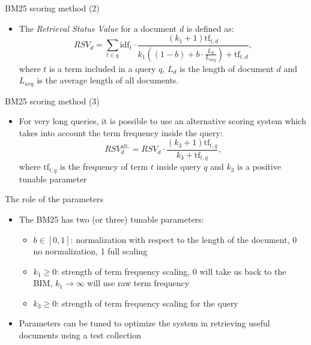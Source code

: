 \documentclass[]{beamer}
\begin{document}
\begin{frame}{BM25 scoring method (2)}
    \begin{itemize}
        \item The \textit{Retrieval Status Value} for a document $d$ is defined as:
    \begin{equation*}
        RSV_d = \sum_{t \in q}^{} \text{idf}_t \cdot \frac{(k_1 + 1) \text{tf}_{t,d}}{k_1((1-b)+b \cdot \frac{L_d}{L_{avg}})+\text{tf}_{t,d}},
    \end{equation*}
    where $t$ is a term included in a query $q$, $L_d$ is the length of document $d$ and $L_{avg}$ is the average length of all documents.
    \end{itemize}
\end{frame}

\begin{frame}{BM25 scoring method (3)}
    \begin{itemize}
        \item For very long queries, it is possible to use an alternative scoring system which takes into account the term frequency inside the query:
        \begin{equation*}
            RSV^{\text{alt.}}_d = RSV_d \cdot \frac{(k_3 +1)\text{tf}_{t,q}}{k_3 + \text{tf}_{t,q}},
        \end{equation*}
        where $\text{tf}_{t,q}$ is the frequency of term $t$ inside query $q$ and $k_3$ is a positive tunable parameter
    \end{itemize}
\end{frame}

\begin{frame}{The role of the parameters}
    \begin{itemize}
        \item The BM25 has two (or three) tunable parameters:
        \begin{itemize}
            \item $b \in [0,1]$: normalization with respect to the length of the document, 0 no normalization, 1 full scaling
            \item $k_1 \geq 0$: strength of term frequency scaling, 0 will take us back to the BIM, $k_1 \rightarrow \infty$ will use raw term frequency
            \item $k_3 \geq 0$: strength of term frequency scaling for the query
        \end{itemize}
        \item Parameters can be tuned to optimize the system in retrieving useful documents using a test collection
    \end{itemize}
\end{frame}
\end{document}
